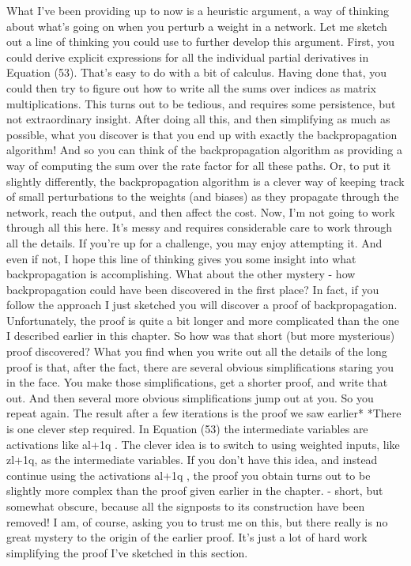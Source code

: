 What I've been providing up to now is a heuristic argument, a way of thinking about what's going on when you perturb a weight in a network. Let me sketch out a line of thinking you could use to further develop this argument. First, you could derive explicit expressions for all the individual partial derivatives in Equation (53). That's easy to do with a bit of calculus. Having done that, you could then try to figure out how to write all the sums over indices as matrix multiplications. This turns out to be tedious, and requires some persistence, but not extraordinary insight. After doing all this, and then simplifying as much as possible, what you discover is that you end up with exactly the backpropagation algorithm! And so you can think of the backpropagation algorithm as providing a way of computing the sum over the rate factor for all these paths. Or, to put it slightly differently, the backpropagation algorithm is a clever way of keeping track of small perturbations to the weights (and biases) as they propagate through the network, reach the output, and then affect the cost.
Now, I'm not going to work through all this here. It's messy and requires considerable care to work through all the details. If you're up for a challenge, you may enjoy attempting it. And even if not, I hope this line of thinking gives you some insight into what backpropagation is accomplishing.
What about the other mystery - how backpropagation could have been discovered in the first place? In fact, if you follow the approach I just sketched you will discover a proof of backpropagation. Unfortunately, the proof is quite a bit longer and more complicated than the one I described earlier in this chapter. So how was that short (but more mysterious) proof discovered? What you find when you write out all the details of the long proof is that, after the fact, there are several obvious simplifications staring you in the face. You make those simplifications, get a shorter proof, and write that out. And then several more obvious simplifications jump out at you. So you repeat again. The result after a few iterations is the proof we saw earlier* *There is one clever step required. In Equation (53) the intermediate variables are activations like al+1q
. The clever idea is to switch to using weighted inputs, like zl+1q, as the intermediate variables. If you don't have this idea, and instead continue using the activations al+1q
, the proof you obtain turns out to be slightly more complex than the proof given earlier in the chapter. - short, but somewhat obscure, because all the signposts to its construction have been removed! I am, of course, asking you to trust me on this, but there really is no great mystery to the origin of the earlier proof. It's just a lot of hard work simplifying the proof I've sketched in this section.

